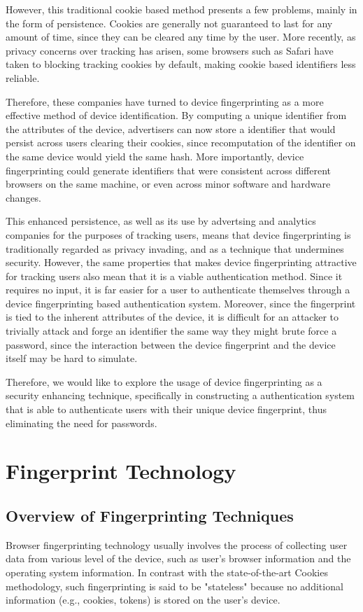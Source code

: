 \documentclass{acm_proc_article-sp}
\begin{document}
However, this traditional cookie based method presents a few problems, mainly in the form of persistence. Cookies are generally not guaranteed to last for any amount of time, since they can be cleared any time by the user. More recently, as privacy concerns over tracking has arisen, some browsers such as Safari have taken to blocking tracking cookies by default, making cookie based identifiers less reliable.

Therefore, these companies have turned to device fingerprinting as a more effective method of device identification. By computing a unique identifier from the attributes of the device, advertisers can now store a identifier that would persist across users clearing their cookies, since recomputation of the identifier on the same device would yield the same hash. More importantly, device fingerprinting could generate identifiers that were consistent across different browsers on the same machine, or even across minor software and hardware changes.

This enhanced persistence, as well as its use by advertsing and analytics companies for the purposes of tracking users, means that device fingerprinting is traditionally regarded as privacy invading, and as a technique that undermines security. However, the same properties that makes device fingerprinting attractive for tracking users also mean that it is a viable authentication method. Since it requires no input, it is far easier for a user to authenticate themselves through a device fingerprinting based authentication system. Moreover, since the fingerprint is tied to the inherent attributes of the device, it is difficult for an attacker to trivially attack and forge an identifier the same way they might brute force a password, since the interaction between the device fingerprint and the device itself may be hard to simulate. 

Therefore, we would like to explore the usage of device fingerprinting as a security enhancing technique, specifically in constructing a authentication system that is able to authenticate users with their unique device fingerprint, thus eliminating the need for passwords.


\section{Fingerprint Technology}

\subsection{Overview of  Fingerprinting Techniques}
Browser fingerprinting technology usually involves the process of collecting user data from various level of the device, such as user's browser information and the operating system information. \cite{pierre:beauty}
In contrast with the state-of-the-art Cookies methodology, such fingerprinting is said to be "stateless" because no additional information (e.g., cookies, tokens) is stored on the user's device. 
\end{document}

